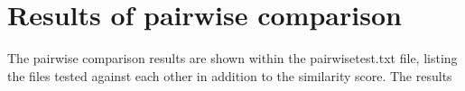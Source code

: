 \section{Results of pairwise comparison}
The pairwise comparison results are shown within the pairwisetest.txt file, listing the files tested against each other in addition to the similarity score. The results 

\break